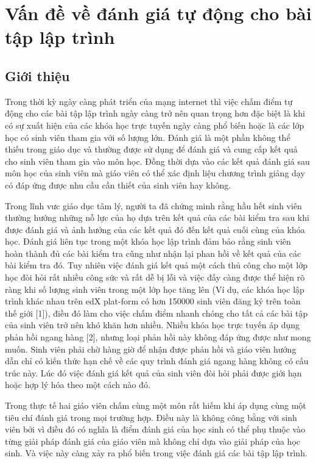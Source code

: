 \documentclass[12pt,a4paper]{article}
\author{Huu Tai}
\begin{document}
\section{Vấn đề về đánh giá tự động cho bài tập lập trình}
\subsection{Giới thiệu}
Trong thời kỳ ngày càng phát triển của mạng internet thì việc chấm điểm tự động cho các bài tập lập trình ngày càng trở nên quan trọng hơn đặc biệt là khi có sự xuất hiện của các khóa học trực tuyến ngày càng phổ biến hoặc là các lớp học có sinh viên tham gia với số lượng lớn. Đánh giá là một phần không thể thiếu trong giáo dục và thường được sử dụng để đánh giá và cung cấp kết quả cho sinh viên tham gia vào môn học. Đồng thời dựa vào các kết quả đánh giá sau môn học của sinh viên mà giáo viên có thể xác định liệu chương trình giảng dạy có đáp ứng được nhu cầu cần thiết của sinh viên hay không.

\indent Trong lĩnh vưc giáo dục tâm lý, người ta đã chứng minh rằng hầu hết sinh viên thường hướng những nỗ lực của họ dựa trên kết quả của các bài kiểm tra sau khi được đánh giá và ảnh hưởng của các kết quả đó đến kết quả cuối cùng của khóa học. Đánh giá liên tục trong một khóa học lập trình đảm bảo rằng sinh viên hoàn thành đủ các bài kiểm tra cũng như nhận lại phan hồi về kết quả của các bài kiểm tra đó. Tuy nhiên việc đánh giá kết quả một cách thủ công cho một lớp học đòi hỏi rất nhiều công sức và rất dễ bị lỗi và việc đấy càng được thể hiện rõ ràng khi số lượng sinh viên trong một lớp học tăng lên (Ví dụ, các khóa học lập trình khác nhau trên edX plat-form có hơn 150000 sinh viên đăng ký trên toàn thế giới [1]), điều đó làm cho việc chấm điểm nhanh chóng cho tất cả các bài tập của sinh viên trở nên khó khăn hơn nhiều. Nhiều khóa học trực tuyến áp dụng phản hồi ngang hàng [2], nhưng loại phản hồi này không đáp ứng được như mong muốn. Sinh viên phải chờ hàng giờ để nhận được phản hồi và giáo viên hướng dẫn chỉ có kiến thức hạn chế về các quy trình đánh giá ngang hàng không có cấu trúc này. Lúc đó việc đánh giá kết quả của sinh viên đòi hỏi phải được giới hạn hoặc hợp lý hóa theo một cách nào đó.

\indent Trong thực tế hai giáo viên chấm cùng một môn rất hiếm khi áp dụng cùng một tiêu chí đánh giá trong mọi trường hợp. Điều này là không công bằng với sinh viên bởi vì điều đó có nghĩa là điểm đánh giá của học sinh có thể phụ thuộc vào từng giải pháp đánh giá của giáo viên mà không chỉ dựa vào giải pháp của học sinh. Và việc này càng xảy ra phổ biến trong việc đánh giá các bài tập lập trình.
\end{document}
